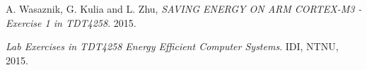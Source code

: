 \begin{thebibliography}{9}

  A. Wasaznik,
  G. Kulia and
  L. Zhu,
  \emph{SAVING ENERGY ON ARM CORTEX-M3 - Exercise 1 in TDT4258}.
  2015.

  \emph{Lab Exercises in TDT4258 Energy Efficient Computer Systems}.
  IDI, NTNU,
  2015.


\end{thebibliography}